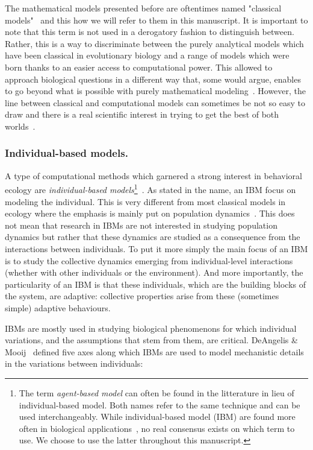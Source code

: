    The mathematical models presented before are oftentimes named "classical models"~\parencite{DeAngelis2005, Adami2014} and this how we will refer to them in this manuscript. It is important to note that this term is not used in a derogatory fashion to distinguish between. Rather, this is a way to discriminate between the purely analytical models which have been classical in evolutionary biology and a range of models which were born thanks to an easier access to computational power. This allowed to approach biological questions in a different way that, some would argue, enables to go beyond what is possible with purely mathematical modeling~\parencite{Adami2012}. However, the line between classical and computational models can sometimes be not so easy to draw and there is a real scientific interest in trying to get the best of both worlds~\parencite{Wilson1998}.

    \subsubsection{Individual-based models.} A type of computational methods which garnered a strong interest in behavioral ecology are \emph{individual-based models}\footnote{The term \emph{agent-based model} can often be found in the litterature in lieu of individual-based model. Both names refer to the same technique and can be used interchangeably. While individual-based model (IBM) are found more often in biological applications~\parencite{Grimm2005}, no real consensus exists on which term to use. We choose to use the latter throughout this manuscript.}~\parencite{Huston1988}. As stated in the name, an IBM focus on modeling the individual. This is very different from most classical models in ecology where the emphasis is mainly put on population dynamics~\parencite{Grimm2005}. This does not mean that research in IBMs are not interested in studying population dynamics but rather that these dynamics are studied as a consequence from the interactions between individuals. To put it more simply the main focus of an IBM is to study the collective dynamics emerging from individual-level interactions (whether with other individuals or the environment). And more importantly, the particularity of an IBM is that these individuals, which are the building blocks of the system, are adaptive: collective properties arise from these (sometimes simple) adaptive behaviours.

    IBMs are mostly used in studying biological phenomenons for which individual variations, and the assumptions that stem from them, are critical. DeAngelis \& Mooij~\parencite{DeAngelis2005} defined five axes along which IBMs are used to model mechanistic details in the variations between individuals:

